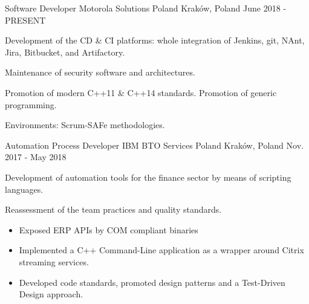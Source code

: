 
\begin{cventries}

\cventry
    {Software Developer} %
    {Motorola Solutions Poland} %
    {Kraków, Poland} %
    {June 2018 - PRESENT} %
    {
        \begin{cvitems} %
            \item {Development of the CD \& CI platforms: whole integration of Jenkins, git, NAnt, Jira, Bitbucket, and Artifactory.}
            \item {Maintenance of security software and architectures.}
            \item {Promotion of modern C++11 \& C++14 standards. Promotion of generic programming.}
            \item {Environments: Scrum-SAFe methodologies.}
        \end{cvitems}
    }

\cventry
    {Automation Process Developer} %
    {IBM BTO Services Poland} %
    {Kraków, Poland} %
    {Nov. 2017 - May 2018} %
    {
        \begin{cvitems} %
            \item {Development of automation tools for the finance sector by means of scripting languages.}
            \item {Reassessment of the team practices and quality standards.}
            \begin{itemize}
                \item {Exposed ERP APIs by COM compliant binaries}
                \item {Implemented a C++ Command-Line application as a wrapper around Citrix streaming services.}
                \item {Developed code standards, promoted design patterns and a Test-Driven Design approach.}
            \end{itemize}
        \end{cvitems}
    }


\end{cventries}
